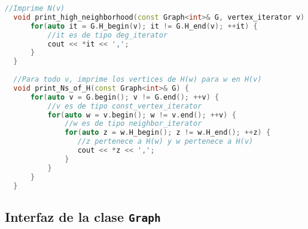 \documentclass[%
    a4paper,%
    fontsize=12pt,%
    DIV=12,
    twoside,%
    openright,%
    titlepage=true,%
    headsepline,%
    toc=bibliography,%
    parskip=half,%
    cleardoublepage=empty,%
    headings=big,%
]{scrbook}
\makeatletter
\newcommand{\Code}[1]{\lstinline[basicstyle={\ttfamily}]@#1@}
\newcommand{\CPPCode}[1]{\lstinline[language=C++,basicstyle={\ttfamily}]@#1@}
\makeatother
\begin{document}
\begin{lstlisting}[caption={Ejemplo de uso de \CPPCode{deg_iterator}.  En el ejemplo, se accede a $H(v)$ para un vértice $v$ invocando \Code{H_begin} usando el grafo, usando directamente un \Code{vertex_iterator} y usando un \Code{deg_iterator}.},name=deg_iterator,gobble=2,float=ht,label={lst:c++:deg_iterator},language=C++]
  //Imprime N(v)
  void print_high_neighborhood(const Graph<int>& G, vertex_iterator v) {
      for(auto it = G.H_begin(v); it != G.H_end(v); ++it) {
          //it es de tipo deg_iterator
          cout << *it << ',';
      }
  }
  
  //Para todo v, imprime los vertices de H(w) para w en H(v)
  void print_Ns_of_H(const Graph<int>& G) {
      for(auto v = G.begin(); v != G.end(); ++v) {
          //v es de tipo const_vertex_iterator
          for(auto w = v.begin(); w != v.end(); ++v) {
              //w es de tipo neighbor_iterator
              for(auto z = w.H_begin(); z != w.H_end(); ++z) {
                 //z pertenece a H(w) y w pertenece a H(v)
                 cout << *z << ',';
              }
          }
      }
  }
\end{lstlisting}

% 
% 

\subsection{Interfaz de la clase \texorpdfstring{\protect\CPPCode{Graph}}{Graph}}
\end{document}
